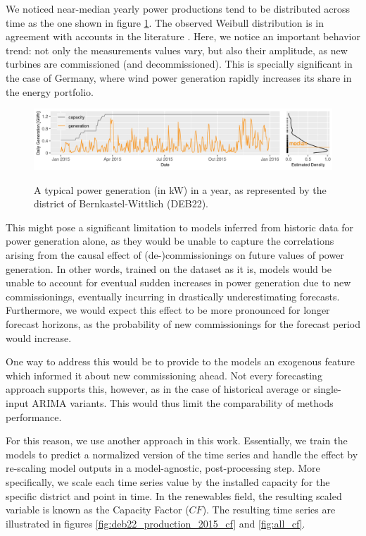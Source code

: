 We noticed near-median yearly power productions tend to be distributed across time as the one shown in figure \ref{fig:deb22_production_2015}.
The observed Weibull distribution is in agreement with accounts in the literature \cite{blaabjerg2017electronics, engeland2017variability, he2014short-term}.
Here, we notice an important behavior trend: not only the measurements values vary, but also their amplitude, as new turbines are commissioned (and decommissioned).
This is specially significant in the case of Germany, where wind power generation rapidly increases its share in the energy portfolio.

\begin{figure}[H]%
	\centering
    \caption{A typical power generation (in kW) in a year, as represented by the district of Bernkastel-Wittlich (DEB22).}
    \includegraphics[width=\textwidth]{wpg-daily-typical-ts_20200701_155716_fav.png}
	\label{fig:deb22_production_2015}
\end{figure}

This might pose a significant limitation to models inferred from historic data for power generation alone, as they would be unable to capture the correlations arising from the causal effect of (de-)commissionings on future values of power generation.
In other words, trained on the dataset as it is, models would be unable to account for eventual sudden increases in power generation due to new commissionings, eventually incurring in drastically underestimating forecasts.
Furthermore, we would expect this effect to be more pronounced for longer forecast horizons, as the probability of new commissionings for the forecast period would increase.

One way to address this would be to provide to the models an exogenous feature which informed it about new commissioning ahead.
Not every forecasting approach supports this, however, as in the case of historical average or single-input ARIMA variants.
This would thus limit the comparability of methods performance.

For this reason, we use another approach in this work.
Essentially, we train the models to predict a normalized version of the time series and handle the effect by re-scaling model outputs in a model-agnostic, post-processing step.
More specifically, we scale each time series value by the installed capacity for the specific district and point in time.
In the renewables field, the resulting scaled variable is known as the Capacity Factor ($CF$).
The resulting time series are illustrated in figures \ref{fig:deb22_production_2015_cf} and \ref{fig:all_cf}.

